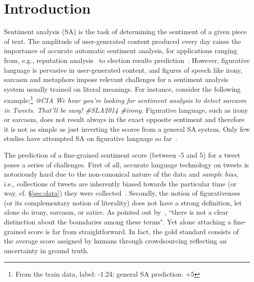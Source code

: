 \documentclass[11pt,letterpaper]{article}
\begin{document}
\section{Introduction}
Sentiment analysis (SA) is the task of determining the sentiment of a given piece of text.
 The amplitude of user-generated content produced every day raises the importance of accurate automatic sentiment analysis, for applications ranging from, e.g., reputation analysis~\cite{amigo2013overview} to election results prediction~\cite{sang2012predicting}. However, figurative language is pervasive in user-generated content, and figures of speech like irony, sarcasm and metaphors impose relevant challenges for a sentiment analysis system usually trained on literal meanings.
For instance, consider the following example:\footnote{From the train data, label: -1.24; general SA prediction: +5} {\em @CIA We hear you're looking for sentiment analysis to detect sarcasm in Tweets. That'll be easy! \#SLA2014 \#irony}. %
 Figurative language, such as irony or sarcasm, does not result always in the exact opposite sentiment and therefore it is not as simple as just inverting the scores from a general SA system.
Only few studies have attempted SA on figurative language so far~\cite{reyes2012making,reyes2013multidimensional}.

The prediction of a fine-grained sentiment score (between -5 and 5) for a tweet poses a series of challenges. 
First of all, accurate language technology on tweets is notoriously hard due to the non-canonical nature of the data and \textit{sample bias}, i.e., collections of tweets are inherently biased towards the particular time (or way, cf. \S \ref{sec:data}) they were collected~\cite{Eisenstein:2013,Hovy:ea:2014:LREC}. Secondly, the notion of figurativeness (or its complementary notion of literality) does not have a strong definition, let alone do irony, sarcasm, or satire. As pointed out by~, ``there is not a clear distinction about the boundaries among these terms".  Yet alone attaching a fine-grained score is far from straightforward. In fact, the gold standard consists of the average score assigned by humans through crowdsourcing reflecting an uncertainty in ground truth. %
\end{document}
